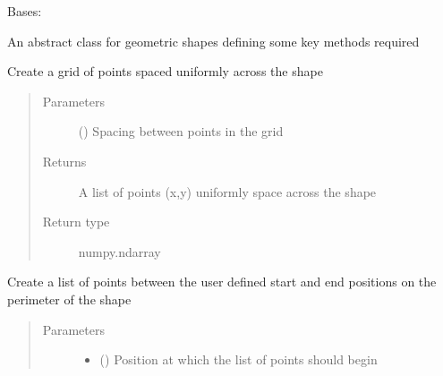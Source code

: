 \documentclass[letterpaper,10pt,english]{sphinxmanual}
\begin{document}
\begin{fulllineitems}
\label{\detokenize{source/pyzones:pyzones.Shape}}
Bases: 

An abstract class for geometric shapes defining some key methods required

\begin{fulllineitems}
\label{\detokenize{source/pyzones:pyzones.Shape.get_grid}}
Create a grid of points spaced uniformly across the shape
\begin{quote}\begin{description}
\item[{Parameters}] \leavevmode
{} () \textendash{} Spacing between points in the grid

\item[{Returns}] \leavevmode
A list of points (x,y) uniformly space across the shape

\item[{Return type}] \leavevmode
numpy.ndarray

\end{description}\end{quote}

\end{fulllineitems}


\begin{fulllineitems}
\label{\detokenize{source/pyzones:pyzones.Shape.get_perimeter}}
Create a list of points between the user defined start and end positions on the perimeter of the shape
\begin{quote}\begin{description}
\item[{Parameters}] \leavevmode\begin{itemize}
\item {} 
 () \textendash{} Position at which the list of points should begin


\end{itemize}
\end{description}
\end{quote}
\end{fulllineitems}
\end{fulllineitems}
\end{document}
